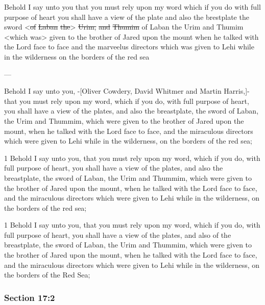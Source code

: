 		\begin{framed}
		\scriptsize
			\begin{compactdesc}
				\item[JSP] Behold I say unto you that you must rely upon my word which if you do with full purpose of heart you shall have a view of the plate and also the brestplate the sword <\sout{of} \sout{Laban} \sout{the}> \sout{Urim,} \sout{and} \sout{Thumim} of Laban the Urim and Thumim <which was> given to the brother of Jared upon the mount when he talked with the Lord face to face and the marveelus directors which was given to Lehi while in the wilderness on the borders of the red sea 
				\item[BC] --- 
				\item[MA] Behold I say unto you, -[Oliver Cowdery, David Whitmer and Martin Harris,]- that you must rely upon my word, which if you do, with full purpose of heart, you shall have a view of the plates, and also the breastplate, the sword of Laban, the Urim and Thummim, which were given to the brother of Jared upon the mount, when he talked with the Lord face to face, and the miraculous directors which were given to Lehi while in the wilderness, on the borders of the red sea; 
				\item[DC 1835] 1 Behold I say unto you, that you must rely upon my word, which if you do, with full purpose of heart, you shall have a view of the plates, and also the breastplate, the sword of Laban, the Urim and Thummim, which were given to the brother of Jared upon the mount, when he talked with the Lord face to face, and the miraculous directors which were given to Lehi while in the wilderness, on the borders of the red sea; 
				\item[DC 1844] 1 Behold I say unto you, that you must rely upon my word, which if you do, with full purpose of heart, you shall have a view of the plates, and also of the breastplate, the sword of Laban, the Urim and Thummim, which were given to the brother of Jared upon the mount, when he talked with the Lord face to face, and the miraculous directors which were given to Lehi while in the wilderness, on the borders of the Red Sea;
			\end{compactdesc}
		\end{framed}

	\subsubsection{Section 17:2} %
		\label{DC17-2}

